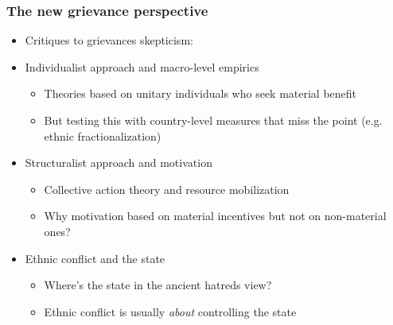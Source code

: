 \documentclass[aspectratio=43]{beamer}
\begin{document}
\begin{frame}
\frametitle{The new grievance perspective}
\centering

\begin{itemize}
  \item<1-> Critiques to grievances skepticism:
  \item<2-> Individualist approach and macro-level empirics
  \begin{itemize}
    \item Theories based on unitary individuals who seek material benefit
    \item But testing this with country-level measures that miss the point (e.g. ethnic fractionalization)
  \end{itemize}
  \item<3-> Structuralist approach and motivation
  \begin{itemize}
    \item Collective action theory and resource mobilization
    \item Why motivation based on material incentives but not on non-material ones?
  \end{itemize}
  \item<4-> Ethnic conflict and the state
  \begin{itemize}
    \item Where's the state in the ancient hatreds view?
    \item Ethnic conflict is usually \textit{about} controlling the state
  \end{itemize}
\end{itemize}

\end{frame}
\end{document}
